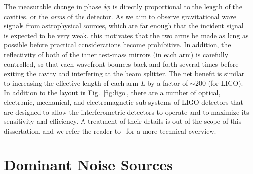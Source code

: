 The measurable change in phase $\delta\phi$ is directly 
proportional to the length of the cavities, or the {\it arms} of the detector.
As we aim to observe gravitational wave signals from 
astrophysical sources, which are far enough that the incident signal is
expected to be very weak, this motivates that the two arms be made as 
long as possible before practical considerations become prohibitive.
% 
In addition, the reflectivity of both of the inner test-mass mirrors (in each 
arm) is carefully controlled, so that each 
wavefront bounces back and forth several times before exiting the cavity and 
interfering at the beam splitter. The net benefit is similar to increasing the
effective length of each arm $L$ by a factor of $\sim 200$ (for LIGO). 
% 
In addition to the layout in Fig.~\ref{fig:ligo}, there are a number of
optical, electronic, mechanical, and electromagnetic sub-systems of LIGO 
detectors that are designed to allow the interferometric detectors
to operate and to maximize its sensitivity and efficiency.
A treatment of their details is out of the scope of this dissertation, and we
refer the reader to~\cite{lrr-2011-5,Harry:2010zz} for a more technical overview.



\section{Dominant Noise Sources}\label{sec:ligo_noise}

